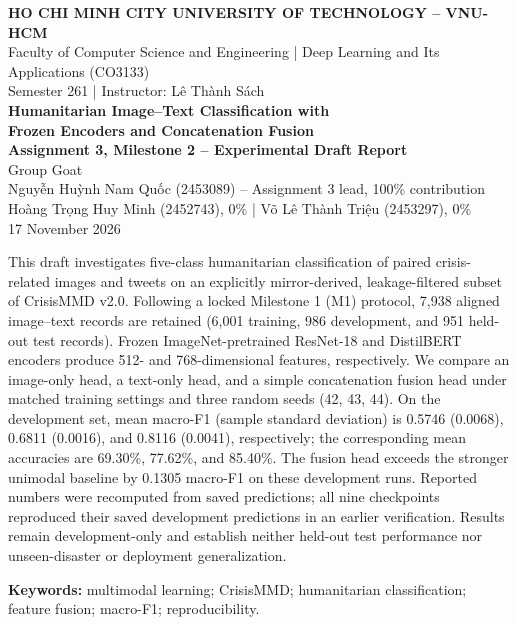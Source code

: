\documentclass[11pt,a4paper]{article}
\begin{document}
\begin{center}
{\footnotesize\bfseries HO CHI MINH CITY UNIVERSITY OF TECHNOLOGY -- VNU-HCM}\\[2pt]
{\footnotesize Faculty of Computer Science and Engineering \;|\; Deep Learning and Its Applications (CO3133)}\\[2pt]
{\footnotesize Semester 261 \;|\; Instructor: Lê Thành Sách}\\[13pt]
{\Large\bfseries Humanitarian Image--Text Classification with\\[2pt]
Frozen Encoders and Concatenation Fusion}\\[7pt]
{\normalsize\bfseries Assignment 3, Milestone 2 -- Experimental Draft Report}\\[5pt]
{\normalsize Group Goat}\\[3pt]
{\small Nguyễn Huỳnh Nam Quốc (2453089) -- Assignment 3 lead, 100\% contribution}\\[2pt]
{\small Hoàng Trọng Huy Minh (2452743), 0\% \;|\; Võ Lê Thành Triệu (2453297), 0\%}\\[3pt]
{\small 17 November 2026}
\end{center}
\vspace{6pt}

\;
This draft investigates five-class humanitarian classification of paired crisis-related images and tweets on an explicitly mirror-derived, leakage-filtered subset of CrisisMMD v2.0. Following a locked Milestone 1 (M1) protocol, 7,938 aligned image--text records are retained (6,001 training, 986 development, and 951 held-out test records). Frozen ImageNet-pretrained ResNet-18 and DistilBERT encoders produce 512- and 768-dimensional features, respectively. We compare an image-only head, a text-only head, and a simple concatenation fusion head under matched training settings and three random seeds (42, 43, 44). On the development set, mean macro-F1 (sample standard deviation) is 0.5746 (0.0068), 0.6811 (0.0016), and 0.8116 (0.0041), respectively; the corresponding mean accuracies are 69.30\%, 77.62\%, and 85.40\%. The fusion head exceeds the stronger unimodal baseline by 0.1305 macro-F1 on these development runs. Reported numbers were recomputed from saved predictions; all nine checkpoints reproduced their saved development predictions in an earlier verification. Results remain development-only and establish neither held-out test performance nor unseen-disaster or deployment generalization.

{\footnotesize\textbf{Keywords:} multimodal learning; CrisisMMD; humanitarian classification; feature fusion; macro-F1; reproducibility.}
\end{document}
